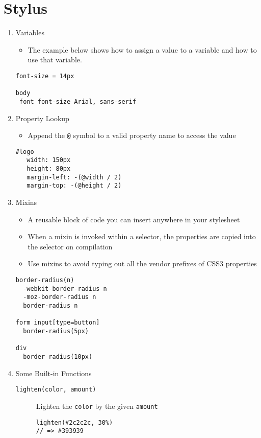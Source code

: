 \documentclass[10pt, twocolumn]{article}
\begin{document}
\section{Stylus}
\begin{enumerate}

\item Variables
\begin{itemize}
\item The example below shows how to assign a value to a variable and how to use that variable.
\end{itemize}
\begin{lstlisting}[frame=single]
font-size = 14px

body
 font font-size Arial, sans-serif
\end{lstlisting}

\item Property Lookup
\begin{itemize}
\item Append the \texttt{@} symbol to a valid property name to access the value
\end{itemize}
\begin{lstlisting}[frame=single]
#logo
   width: 150px
   height: 80px
   margin-left: -(@width / 2)
   margin-top: -(@height / 2)
\end{lstlisting}

\item Mixins
\begin{itemize}
\item A reusable block of code you can insert anywhere in your stylesheet
\item When a mixin is invoked within a selector, the properties are copied into the selector on compilation
\item Use mixins to avoid typing out all the vendor prefixes of CSS3 properties
\end{itemize}
\begin{lstlisting}[frame=single]
border-radius(n)
  -webkit-border-radius n
  -moz-border-radius n
  border-radius n

form input[type=button]
  border-radius(5px)

div
  border-radius(10px)    
\end{lstlisting}

\item Some Built-in Functions
\begin{description}
\item[\texttt{lighten(color, amount)}] Lighten the \texttt{color} by the given \texttt{amount}
\begin{lstlisting}[frame=single]
lighten(#2c2c2c, 30%)
// => #393939 
\end{lstlisting}


\end{description}
\end{enumerate}
\end{document}
